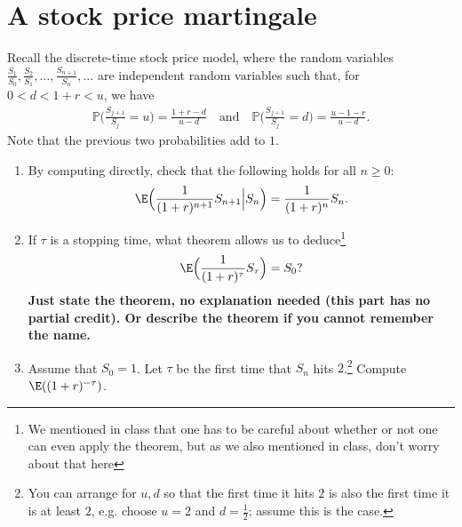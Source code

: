 \documentclass[12pt,reqno]{amsart}
\theoremstyle{definition}
\theoremstyle{remark}
\numberwithin{equation}{section}
\begin{document}
\section{A stock price martingale}
Recall the discrete-time stock price model, where the random variables $\frac{S_{1}}{S_{0}},\frac{S_{2}}{S_{1}},\ldots,\frac{S_{n+1}}{S_{n}},\ldots$ are independent random variables such that, for $0<d<1+r<u$, we have 
%
\begin{align*}
\mathbb{P}\Big(\frac{S_{j+1}}{S_{j}}=u\Big)=\frac{1+r-d}{u-d} \quad\text{and}\quad \mathbb{P}\Big(\frac{S_{j+1}}{S_{j}}=d\Big)=\frac{u-1-r}{u-d}.
\end{align*}
%
Note that the previous two probabilities add to $1$.
\begin{enumerate}
\item By computing directly, check that the following holds for all $n\geq0$:
%
\begin{align*}
\E\Big(\frac{1}{(1+r)^{n+1}}S_{n+1}\Big|S_{n}\Big)=\frac{1}{(1+r)^{n}}S_{n}.
\end{align*}
%
\item If $\tau$ is a stopping time, what theorem allows us to deduce\footnote{We mentioned in class that one has to be careful about whether or not one can even apply the theorem, but as we also mentioned in class, don't worry about that here}
%
\begin{align*}
\E\Big(\frac{1}{(1+r)^{\tau}}S_{\tau}\Big)=S_{0}?
\end{align*}
%
{\bf Just state the theorem, no explanation needed (this part has no partial credit). Or describe the theorem if you cannot remember the name.}
\item Assume that $S_{0}=1$. Let $\tau$ be the first time that $S_{n}$ hits $2$.\footnote{You can arrange for $u,d$ so that the first time it hits $2$ is also the first time it is at least $2$, e.g. choose $u=2$ and $d=\frac12$; assume this is the case.} Compute $\E((1+r)^{-\tau})$.
\end{enumerate}







\newpage


\end{document}
